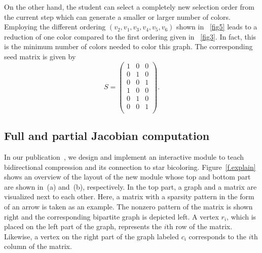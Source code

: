 \documentclass[12pt, twoside,a4paper,toc=bibliography]{scrbook}
\begin{document}
On the other hand, the student can select a completely new selection order from the current step which can generate a smaller or larger number of colors. Employing the different ordering $(v_2,v_1,v_3,v_4,v_5,v_6)$ shown in \figurename~\ref{fig5} leads to a reduction of one color compared to the first ordering given in \figurename~\ref{fig3}. In fact, this is the minimum number of colors needed to color this graph. The corresponding seed matrix is given by
$$
S =
\begin{pmatrix}
1 & 0 & 0 \\
0 & 1 & 0 \\
0 & 0 & 1 \\
1 & 0 & 0 \\
0 & 1 & 0 \\
0 & 0 & 1 \\
\end{pmatrix}.
$$
\subsection{Full and partial Jacobian computation}%
\label{s.bidirectional}
In our publication~\cite{2014:09}, we design and implement an interactive module to
teach bidirectional compression and its connection to star bicoloring.
Figure~\ref{f.explain} shows an overview of the layout of the new module whose top and
bottom part are shown in~(a) and~(b), respectively. In the top part, a graph and a matrix
are visualized next to each other. Here, a matrix with a sparsity pattern in the form of
an arrow is taken as an example. The nonzero pattern of the matrix is shown right and the
corresponding bipartite graph is depicted left. A vertex $r_i$, which is placed on the
left part of the graph, represents the $i$th row of the matrix. Likewise, a vertex on the
right part of the graph labeled $c_i$ corresponds to the $i$th column of the matrix.
\end{document}
